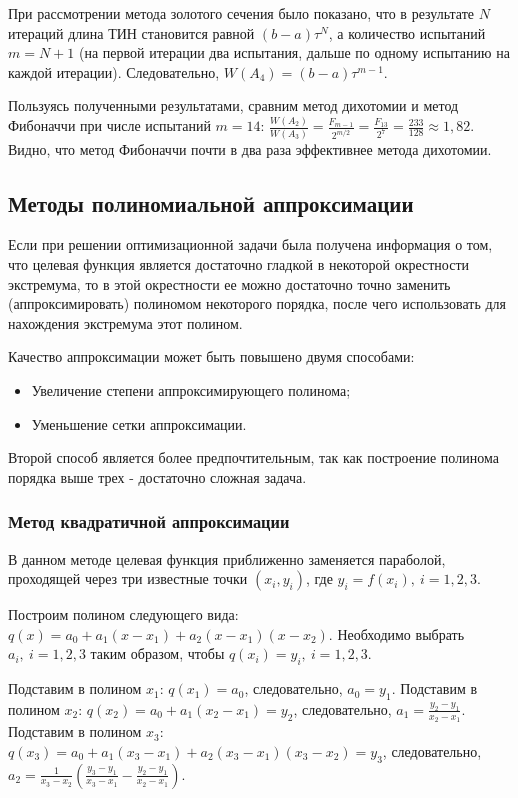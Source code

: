 \documentclass[a4paper,12pt]{report}
\begin{document}
При рассмотрении метода золотого сечения было показано, что в результате $N$ итераций длина ТИН становится равной $\left(b-a\right)\tau^{N}$, а количество испытаний $m = N + 1$ (на первой итерации два испытания, дальше по одному испытанию на каждой итерации). Следовательно, $W(A_{4}) = \left(b-a\right)\tau^{m-1}$.

Пользуясь полученными результатами, сравним метод дихотомии и метод Фибоначчи при числе испытаний $m = 14$: $\frac{W(A_{2})}{W(A_{3})} = \frac{F_{m-1}}{2^{m/2}} = \frac{F_{13}}{2^{7}} = \frac{233}{128} \approx 1,82$. Видно, что метод Фибоначчи почти в два раза эффективнее метода дихотомии.

\subsection{Методы полиномиальной аппроксимации}
Если при решении оптимизационной задачи была получена информация о том, что целевая функция является достаточно гладкой в некоторой окрестности экстремума, то в этой окрестности ее можно достаточно точно заменить (аппроксимировать) полиномом некоторого порядка, после чего использовать для нахождения экстремума этот полином.

Качество аппроксимации может быть повышено двумя способами:
\begin{itemize}
\item Увеличение степени аппроксимирующего полинома;
\item Уменьшение сетки аппроксимации.
\end{itemize}
Второй способ является более предпочтительным, так как построение полинома порядка выше трех - достаточно сложная задача.

\subsubsection{Метод квадратичной аппроксимации}
В данном методе целевая функция приближенно заменяется параболой, проходящей через три известные точки $\left(x_{i}, y_{i}\right)$, где $y_{i} = f(x_{i}),\ i=1,2,3$.

Построим полином следующего вида: $q(x) = a_{0} + a_{1}(x-x_{1}) + a_{2}(x-x_{1})(x-x_{2})$. Необходимо выбрать $a_{i},\ i=1,2,3$ таким образом, чтобы $q(x_{i}) = y_{i},\ i=1,2,3$.

Подставим в полином $x_{1}$: $q(x_{1}) = a_{0}$, следовательно, $a_{0} = y_{1}$. Подставим в полином $x_{2}$: $q(x_{2}) = a_{0} + a_{1}(x_{2}-x_{1}) = y_{2}$, следовательно, $a_{1} = \frac{y_{2} - y_{1}}{x_{2} - x_{1}}$. Подставим в полином $x_{3}$: $q(x_{3}) = a_{0} + a_{1}(x_{3}-x_{1}) + a_{2}(x_{3} - x_{1})(x_{3}-x_{2}) = y_{3}$, следовательно, $a_{2} = \frac{1}{x_{3} - x_{2}}\left(\frac{y_{3}-y_{1}}{x_{3}-x_{1}} - \frac{y_{2}-y_{1}}{x_{2}-x_{1}}\right)$.
\end{document}
